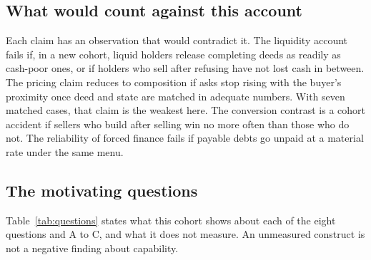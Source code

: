 \subsection{What would count against this account}

Each claim has an observation that would contradict it. The liquidity account fails if, in a new cohort, liquid holders release completing deeds as readily as cash-poor ones, or if holders who sell after refusing have not lost cash in between. The pricing claim reduces to composition if asks stop rising with the buyer's proximity once deed and state are matched in adequate numbers. With seven matched cases, that claim is the weakest here. The conversion contrast is a cohort accident if sellers who build after selling win no more often than those who do not. The reliability of forced finance fails if payable debts go unpaid at a material rate under the same menu.

\subsection{The motivating questions}

Table~\ref{tab:questions} states what this cohort shows about each of the eight questions and A to C, and what it does not measure. An unmeasured construct is not a negative finding about capability.


